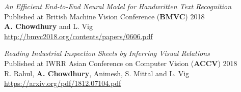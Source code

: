 \begin{resume}
\textit{An Efficient End-to-End Neural Model for Handwritten Text Recognition}\\
Published at British Machine Vision Conference (\textbf{BMVC}) 2018\\
\textbf{A. Chowdhury} and L. Vig\\
\url{http://bmvc2018.org/contents/papers/0606.pdf}

\textit{Reading Industrial Inspection Sheets by Inferring Visual Relations}\\
Published at IWRR Asian Conference on Computer Vision (\textbf{ACCV}) 2018\\
R. Rahul, \textbf{A. Chowdhury}, Animesh, S. Mittal and L. Vig\\
\url{https://arxiv.org/pdf/1812.07104.pdf}


%
%
%
%


\end{resume}
